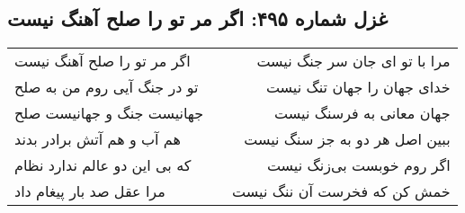 \begin{center}
\section*{غزل شماره ۴۹۵: اگر مر تو را صلح آهنگ نیست}
\label{sec:0495}
\begin{longtable}{l p{0.5cm} r}
اگر مر تو را صلح آهنگ نیست
&&
مرا با تو ای جان سر جنگ نیست
\\
تو در جنگ آیی روم من به صلح
&&
خدای جهان را جهان تنگ نیست
\\
جهانیست جنگ و جهانیست صلح
&&
جهان معانی به فرسنگ نیست
\\
هم آب و هم آتش برادر بدند
&&
ببین اصل هر دو به جز سنگ نیست
\\
که بی این دو عالم ندارد نظام
&&
اگر روم خوبست بی‌زنگ نیست
\\
مرا عقل صد بار پیغام داد
&&
خمش کن که فخرست آن ننگ نیست
\\
\end{longtable}
\end{center}
